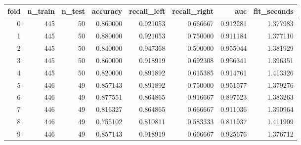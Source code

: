 \begin{tabular}{rrrrrrrr}
\toprule
fold & n_train & n_test & accuracy & recall_left & recall_right & auc & fit_seconds \\
\midrule
0 & 445 & 50 & 0.860000 & 0.921053 & 0.666667 & 0.912281 & 1.377983 \\
1 & 445 & 50 & 0.880000 & 0.921053 & 0.750000 & 0.911184 & 1.377110 \\
2 & 445 & 50 & 0.840000 & 0.947368 & 0.500000 & 0.955044 & 1.381929 \\
3 & 445 & 50 & 0.860000 & 0.918919 & 0.692308 & 0.956341 & 1.396351 \\
4 & 445 & 50 & 0.820000 & 0.891892 & 0.615385 & 0.914761 & 1.413326 \\
5 & 446 & 49 & 0.857143 & 0.891892 & 0.750000 & 0.951577 & 1.379276 \\
6 & 446 & 49 & 0.877551 & 0.864865 & 0.916667 & 0.897523 & 1.383263 \\
7 & 446 & 49 & 0.816327 & 0.864865 & 0.666667 & 0.911036 & 1.390964 \\
8 & 446 & 49 & 0.755102 & 0.810811 & 0.583333 & 0.811937 & 1.411909 \\
9 & 446 & 49 & 0.857143 & 0.918919 & 0.666667 & 0.925676 & 1.376712 \\
\bottomrule
\end{tabular}
